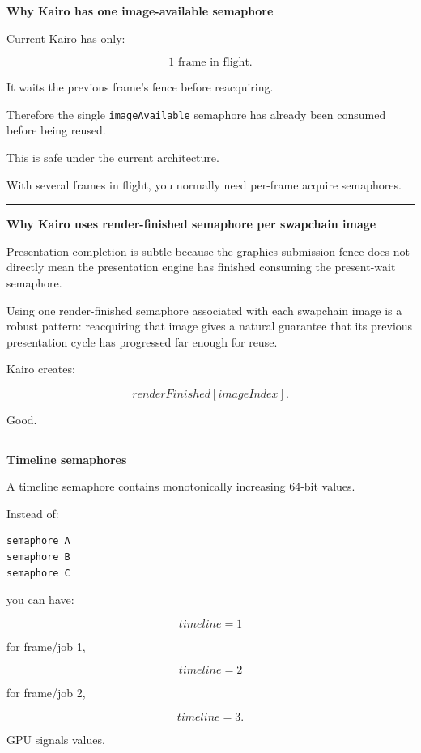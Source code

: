 \textbf{Why Kairo has one image-available semaphore}

Current Kairo has only:

\[
1\text{ frame in flight}.
\]

It waits the previous frame's fence before reacquiring.

Therefore the single \texttt{imageAvailable} semaphore has already been consumed before being reused.

This is safe under the current architecture.

With several frames in flight, you normally need per-frame acquire semaphores.

\begin{center}\rule{0.5\linewidth}{0.5pt}\end{center}

\textbf{Why Kairo uses render-finished semaphore per swapchain image}

Presentation completion is subtle because the graphics submission fence does not directly mean the presentation engine has finished consuming the present-wait semaphore.

Using one render-finished semaphore associated with each swapchain image is a robust pattern: reacquiring that image gives a natural guarantee that its previous presentation cycle has progressed far enough for reuse.

Kairo creates:

\[
renderFinished[imageIndex].
\]

Good.

\begin{center}\rule{0.5\linewidth}{0.5pt}\end{center}

\textbf{Timeline semaphores}

A timeline semaphore contains monotonically increasing 64-bit values.

Instead of:

\begin{verbatim}
semaphore A
semaphore B
semaphore C
\end{verbatim}

you can have:

\[
timeline=1
\]

for frame/job 1,

\[
timeline=2
\]

for frame/job 2,

\[
timeline=3.
\]

GPU signals values.

